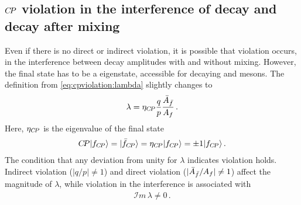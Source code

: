 
\subsection{\texorpdfstring{$\CP$}{CP} violation in the interference of decay and decay after mixing}
\label{sec:cpviolation:types:interference}

Even if there is no direct or indirect \CP violation, it is possible that \CP
violation occurs, in the interference between decay amplitudes with and
without mixing. However, the final state has to be a \CP eigenstate, \ie
accessible for decaying \Bd and \Bdb mesons. The definition from
\cref{eq:cpviolation:lambda} slightly changes to
\begin{align}
  \lambda = \eta_{\CP} \frac qp \frac{\Abarfbar}{\Af}\,.
\end{align}
Here, $\eta_{\CP}$ is the \CP eigenvalue of the final state
\begin{align}
  \CP \ket{f_{\CP}} = \ket{\fbar_{\CP}} = \eta_{\CP} \ket{f_{\CP}} = \num{\pm1} \ket{f_{\CP}}\,.
\end{align}
The condition that any deviation from unity for $\lambda$ indicates \CP
violation holds. Indirect \CP violation ($|q/p| \neq 1$) and direct \CP
violation ($|\Abarfbar/\Af| \neq 1$) affect the magnitude of $\lambda$, while
\CP violation in the interference is associated with
\begin{align}
  \mathcal{I}m\,\lambda \neq 0\,.
\label{eq:cpviolation:imlambda}
\end{align}

